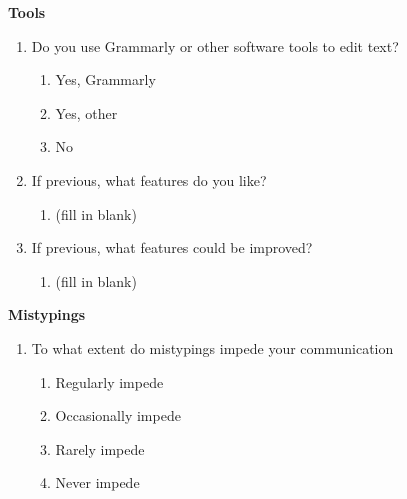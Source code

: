 \documentclass[acmsmall,screen,authorversion,nonacm]{acmart}
\begin{document}
\textbf{Tools}
\begin{enumerate}
    \item Do you use Grammarly or other software tools to edit text?
        \begin{enumerate}
            \item Yes, Grammarly
            \item Yes, other
            \item No
        \end{enumerate}
    \item If previous, what features do you like?
        \begin{enumerate}
            \item (fill in blank)
        \end{enumerate}
    \item If previous, what features could be improved?
        \begin{enumerate}
            \item (fill in blank)
        \end{enumerate}
\end{enumerate}

\textbf{Mistypings}
\begin{enumerate}
    \item To what extent do mistypings impede your communication
        \begin{enumerate}
            \item Regularly impede
            \item Occasionally impede
            \item Rarely impede
            \item Never impede
        \end{enumerate}
\end{enumerate}
\end{document}
